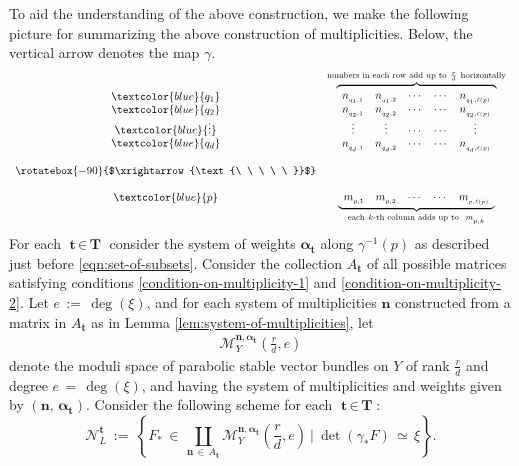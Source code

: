 \documentclass[10pt,reqno]{amsart}
\newcommand{\mc}[1]{\mathcal{#1}}
\theoremstyle{myroman}
\numberwithin{equation}{section}
\begin{document}
		To aid the understanding of the above construction, we make the following picture for summarizing the above construction of multiplicities. Below, the vertical arrow denotes the map $\gamma$.
		\[\begin{array}{cc}
			{\begin{array}{c}
					\textcolor{blue}{q_1} \\ \textcolor{blue}{q_2}\\ \textcolor{blue}{\vdots} \\ \textcolor{blue}{q_d}
			\end{array}} &
			{\overbrace{
					\begin{array}{cccccccc}
						n_{_{q_1,1}} & n_{_{q_1,2}} & \cdots & \cdots& n_{_{q_1,\ell(p)}} \\
						n_{_{q_2,1}} & n_{_{q_2,2}} & \cdots & \cdots& n_{_{q_2,\ell(p)}} \\
						\vdots & \vdots & \cdots & \cdots&\vdots\\
						n_{_{q_d,1}} & n_{_{q_d,2}} & \cdots & \cdots&n_{_{q_d,\ell(p)}}
					\end{array}
				}^{\text{numbers in each row add up to}\ \frac{r}{d}\ \text{horizontally}}}\\
			&\\
			\rotatebox{-90}{$\xrightarrow{\text{\ \ \ \ \ }}$} &  \\
			&\\
			\textcolor{blue}{p} & {\underbrace{\begin{array}{cccccccc}
						m_{_{p,1}} & m_{_{p,2}} & \cdots & \cdots & m_{_{p,\ell(p)}}
				\end{array}}_{\text{each}\ k\text{-th column adds up to }\ m_{_{p,k}}}}
		\end{array}
		\]
		For each $\textbf{t}\,\in\, \textbf{T}$ consider the system of weights
		$\boldsymbol{\alpha}_{\textbf{t}}$ along $\gamma^{-1}(p)$ as described just before
		\eqref{eqn:set-of-subsets}. Consider the collection $A_{\textbf{t}}$ of all possible matrices satisfying conditions \eqref{condition-on-multiplicity-1} and \eqref{condition-on-multiplicity-2}. Let $e\,:=\,\deg(\xi)$, and for each system of multiplicities $\textbf{n}$ constructed from a matrix in $A_{\textbf{t}}$ as in Lemma \ref{lem:system-of-multiplicities}, let
		\begin{align*}
			\mc{M}^{\textbf{n},\boldsymbol{\alpha}_{\textbf{t}}}_{Y}\left(\frac{r}{d},e\right)
		\end{align*}
		denote the moduli space of parabolic stable vector bundles on $Y$ of rank $\frac{r}{d}$ and
		degree $e\,=\,\deg(\xi)$, and having the system of multiplicities and weights given by
		$(\boldsymbol{n},\,\boldsymbol{\alpha}_{\textbf{t}})$. Consider the following scheme  for each
		$\textbf{t}\,\in\, \textbf{T}$:
		\begin{equation}\label{eqn:moduli}
			\mathcal{N}^\textbf{t}_L\ :=\ \left\{F_*\,\in\, \coprod_{\boldsymbol{n}\,\in\,
				A_{\textbf{t}}}\mc{M}_Y^{\boldsymbol{n},\boldsymbol{\alpha}_{\textbf{t}}}\left(\frac{r}{d},e\right)\
			\big\vert\ \det(\gamma_*F)\,\simeq\, \xi\right\}.
		\end{equation}
		
\end{document}
